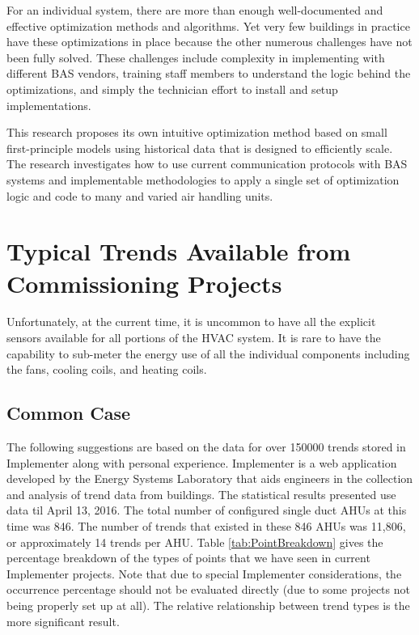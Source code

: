 For an individual system, there are more than enough well-documented and
effective optimization methods and algorithms. Yet very few buildings in
practice have these optimizations in place because the other numerous
challenges have not been fully solved. These challenges include
complexity in implementing with different BAS vendors, training staff
members to understand the logic behind the optimizations, and simply the
technician effort to install and setup implementations.

This research proposes its own intuitive optimization method based on
small first-principle models using historical data that is
designed to efficiently scale. The research investigates how to use
current communication protocols with BAS systems and implementable
methodologies to apply a single set of optimization logic and code to
many and varied air handling units. 

\section{Typical Trends Available from Commissioning Projects}

Unfortunately, at the current time, it is uncommon to have all the
explicit sensors available for all portions of the HVAC system.  It is
rare to have the capability to sub-meter the energy use of all the
individual components including the fans, cooling coils, and heating
coils. 

\subsection{Common Case}

The following suggestions are based on the data for over \num{150000}
trends stored in Implementer along with personal experience. Implementer
is a web application developed by the Energy Systems Laboratory that
aids engineers in the collection and analysis of trend data from
buildings.  The statistical results presented use data til April 13, 
2016. The total number of configured single duct AHUs at this time was
846. The number of trends that existed in these 846 AHUs was
11,806, or approximately 14 trends per AHU. Table
\ref{tab:PointBreakdown} gives the percentage breakdown of the types of
points that we have seen in current Implementer projects. Note that due
to special Implementer considerations, the occurrence percentage
should not be evaluated directly (due to some projects not being
properly set up at all). The relative relationship between trend types is
the more significant result.  


